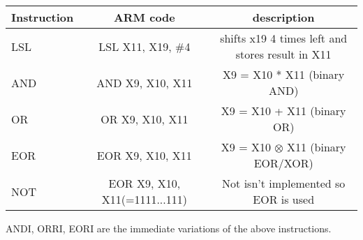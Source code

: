 \documentclass[a4paper]{scrartcl}
\begin{document}
            \begin{center}
                \begin{tabular}{|l|c|c|}
                    \hline
                    Instruction & ARM code & description \\
                    \hline
                    LSL & LSL X11, X19, \#4 & shifts x19 4 times left and stores result in X11 \\
                    \hline
                    AND & AND X9, X10, X11 & X9 = X10 * X11 (binary AND) \\
                    \hline
                    OR & OR X9, X10, X11 & X9 = X10 + X11 (binary OR) \\
                    \hline 
                    EOR & EOR X9, X10, X11 & X9 = X10 \(\otimes \) X11 (binary EOR/XOR) \\
                    \hline
                    NOT & EOR X9, X10, X11(=1111...111) & Not isn't implemented so EOR is used \\
                    \hline 
                \end{tabular}
            \end{center}
            ANDI, ORRI, EORI are the immediate variations of the above instructions.
\end{document}
